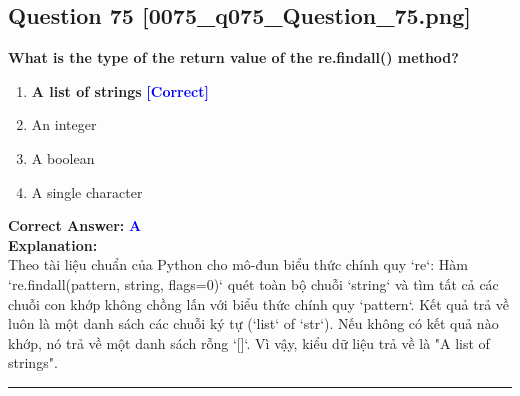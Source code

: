 \documentclass[11pt,a4paper]{article}
\begin{document}
\begin{minipage}{\textwidth}
\subsection*{Question 75 \quad \footnotesize{[0075_q075_Question_75.png]}}
\noindent \textbf{What is the type of the return value of the re.findall() method?}

\begin{enumerate}[label=\Alph*.]
    \item \textbf{A list of strings} \hfill \textcolor{blue}{\textbf{[Correct]}}
    \item An integer
    \item A boolean
    \item A single character
\end{enumerate}

\noindent \textbf{Correct Answer:} \textcolor{blue}{\textbf{A}} \\[4pt]
\noindent \textbf{Explanation:}\\
Theo tài liệu chuẩn của Python cho mô-đun biểu thức chính quy `re`:\newline
Hàm `re.findall(pattern, string, flags=0)` quét toàn bộ chuỗi `string` và tìm tất cả các chuỗi con khớp không chồng lấn với biểu thức chính quy `pattern`. Kết quả trả về luôn là một danh sách các chuỗi ký tự (`list` of `str`). Nếu không có kết quả nào khớp, nó trả về một danh sách rỗng `[]`.\newline
Vì vậy, kiểu dữ liệu trả về là "A list of strings".
\end{minipage}
\vspace{0.8cm}
\hrule
\vspace{0.5cm}
\end{document}

